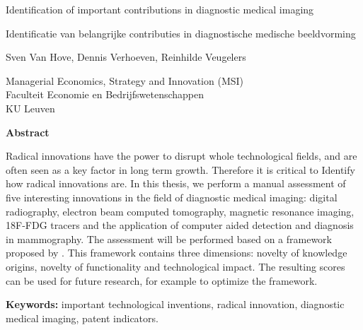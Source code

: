 
\cleardoublepage
\thispagestyle{plain}
\begin{center}
    \Huge 
    Identification of important contributions in diagnostic medical imaging
    
    \vspace{0.5cm}
    
    \large
    Identificatie van belangrijke contributies in diagnostische medische beeldvorming
    
    \vspace{1.0cm}
    
    Sven Van Hove, Dennis Verhoeven, Reinhilde Veugelers
    
    \vspace{0.5cm}
    
	Managerial Economics, Strategy and Innovation (MSI)\\
	Faculteit Economie en Bedrijfswetenschappen\\
	KU Leuven
    
    \vspace{1.0cm}
    \textbf{Abstract}
\end{center}

Radical innovations have the power to disrupt whole technological fields, and
are often seen as a key factor in long term growth. Therefore it is critical to
Identify how radical innovations are. In this thesis, we perform a manual
assessment of five interesting innovations in the field of diagnostic medical
imaging: digital radiography, electron beam computed tomography, magnetic
resonance imaging, 18F-FDG tracers and the application of computer aided
detection and diagnosis in mammography. The assessment will be performed based
on a framework proposed by \cite{verhoeven}. This framework contains three
dimensions: novelty of knowledge origins, novelty of functionality  and
technological impact. The resulting scores can be used for future research, for
example to optimize the framework.

\vspace{1.0cm}

\textbf{Keywords:} important technological inventions, radical innovation,
diagnostic medical imaging, patent indicators.